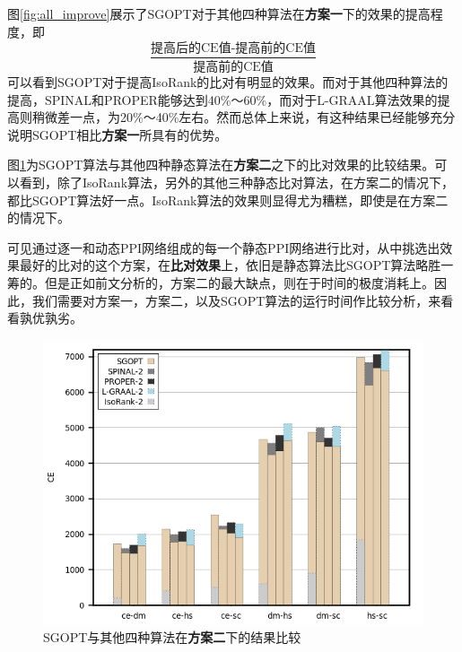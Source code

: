 图\ref{fig:all_improve}展示了SGOPT对于其他四种算法在\textbf{方案一}下的效果的提高程度，即
\begin{equation}
\frac{\text{提高后的CE值-提高前的CE值}}{\text{提高前的CE值}}    
\end{equation}
可以看到SGOPT对于提高IsoRank的比对有明显的效果。而对于其他四种算法的提高，SPINAL和PROPER能够达到40\%～60\%，而对于L-GRAAL算法效果的提高则稍微差一点，为20\%～40\%左右。然而总体上来说，有这种结果已经能够充分说明SGOPT相比\textbf{方案一}所具有的优势。

图\ref{fig:all2}为SGOPT算法与其他四种静态算法在\textbf{方案二}之下的比对效果的比较结果。可以看到，除了IsoRank算法，另外的其他三种静态比对算法，在方案二的情况下，都比SGOPT算法好一点。IsoRank算法的效果则显得尤为糟糕，即使是在方案二的情况下。

可见通过逐一和动态PPI网络组成的每一个静态PPI网络进行比对，从中挑选出效果最好的比对的这个方案，在\textbf{比对效果}上，依旧是静态算法比SGOPT算法略胜一筹的。但是正如前文分析的，方案二的最大缺点，则在于时间的极度消耗上。因此，我们需要对方案一，方案二，以及SGOPT算法的运行时间作比较分析，来看看孰优孰劣。

\begin{figure}[htbp]
\centering
\includegraphics[height=0.25\textheight]{pic/all2.png}
\caption{SGOPT与其他四种算法在\textbf{方案二}下的结果比较} 
\label{fig:all2}
\end{figure}


